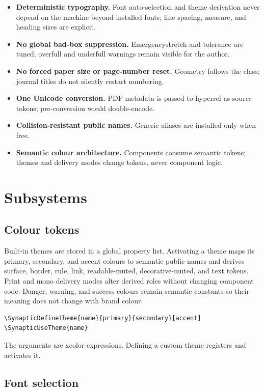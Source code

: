 \documentclass[a4paper,11pt]{scrartcl}
\begin{document}
\begin{itemize}
  \item \textbf{Deterministic typography.} Font auto-selection and theme
    derivation never depend on the machine beyond installed fonts; line
    spacing, measure, and heading sizes are explicit.
  \item \textbf{No global bad-box suppression.} Emergencystretch and tolerance
    are tuned; overfull and underfull warnings remain visible for the author.
  \item \textbf{No forced paper size or page-number reset.} Geometry follows
    the class; journal titles do not silently restart numbering.
  \item \textbf{One Unicode conversion.} PDF metadata is passed to hyperref as
    source tokens; pre-conversion would double-encode.
  \item \textbf{Collision-resistant public names.} Generic aliases are
    installed only when free.
  \item \textbf{Semantic colour architecture.} Components consume semantic
    tokens; themes and delivery modes change tokens, never component logic.
\end{itemize}

\section{Subsystems}

\subsection{Colour tokens}

Built-in themes are stored in a global property list. Activating a theme maps
its primary, secondary, and accent colours to semantic public names and derives
surface, border, rule, link, readable-muted, decorative-muted, and text tokens.
Print and mono delivery modes alter derived roles without changing component
code. Danger, warning, and success
colours remain semantic constants so their meaning does not change with brand
colour.

\begin{verbatim}
\SynapticDefineTheme{name}{primary}{secondary}[accent]
\SynapticUseTheme{name}
\end{verbatim}

The arguments are xcolor expressions. Defining a custom theme registers and
activates it.

\subsection{Font selection}
\end{document}

